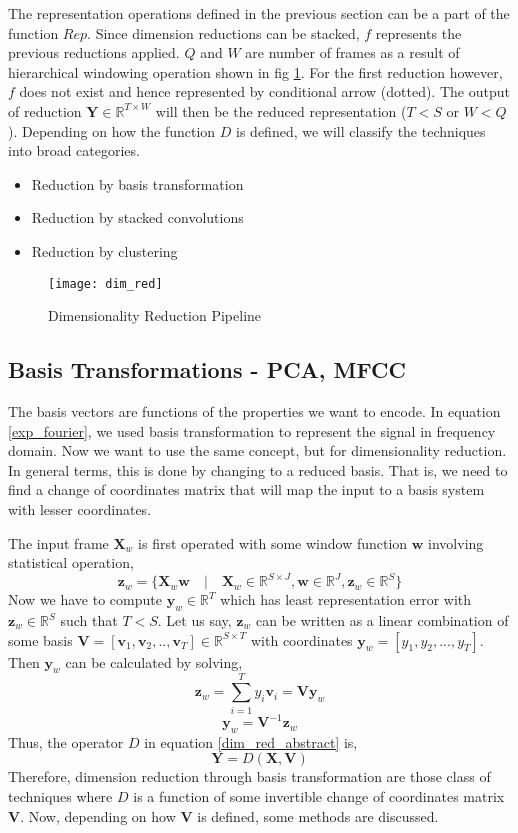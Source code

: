 \noindent The representation operations defined in the previous section can be a part of the function $Rep$. Since dimension reductions can be stacked, $f$ represents the previous reductions applied. $Q$ and $W$ are number of frames as a result of hierarchical windowing operation shown in fig \ref{fig:Dimensionality Reduction}. For the first reduction however, $f$ does not exist and hence represented by conditional arrow (dotted). The output of reduction $\textbf{Y} \in \mathbb{R}^{T \times W}$ will then be the reduced representation ($T < S$ or $W < Q$). Depending on how the function $D$ is defined, we will classify the techniques into broad categories.
\begin{itemize}
  \item Reduction by basis transformation
  \item Reduction by stacked convolutions
  \item Reduction by clustering 
\end{itemize} 
\begin{figure}[h] 
\centering
\texttt{[image: dim\_red]}
\caption{Dimensionality Reduction Pipeline}
 \label{fig:Dimensionality Reduction}
 \end{figure}
\FloatBarrier
\bigskip

\subsection{Basis Transformations - PCA, MFCC}
\label{basis}

The basis vectors are functions of the properties we want to encode. In equation \ref{exp_fourier}, we used basis transformation to represent the signal in frequency domain. Now we want to use the same concept, but for dimensionality reduction. In general terms, this is done by changing to a reduced basis. That is, we need to find a change of coordinates matrix that will map the input to a basis system with lesser coordinates. 
\bigskip

\noindent The input frame $\textbf{X}_{w}$ is first operated with some window function $\textbf{w}$ involving statistical operation,
\[
  \textbf{z}_{w} = \{\textbf{X}_{w}\textbf{w} \quad | \quad \textbf{X}_{w} \in \mathbb{R}^{S \times J}, \textbf{w} \in \mathbb{R}^{J}, \textbf{z}_{w} \in \mathbb{R}^{S}\}
\]    
Now we have to compute $\textbf{y}_{w} \in \mathbb{R}^{T}$ which has least representation error with $\textbf{z}_{w} \in \mathbb{R}^{S}$ such that $T < S$. Let us say, $\textbf{z}_{w}$ can be written as a linear combination of some basis $\textbf{V} = [\textbf{v}_{1}, \textbf{v}_{2}, ..,\textbf{v}_{T}] \in \mathbb{R}^{S \times T}$ with coordinates $\textbf{y}_{w} = [y_{1}, y_{2},...,y_{T}]$. Then $\textbf{y}_{w}$ can be calculated by solving,
\[
\textbf{z}_{w} = \displaystyle\sum_{i=1}^{T}y_{i}\textbf{v}_{i} = \textbf{V}\textbf{y}_{w}
\]
\[
\textbf{y}_{w} = \textbf{V}^{-1}\textbf{z}_{w}
\]
Thus, the operator $D$ in equation \ref{dim_red_abstract} is,
\[
\textbf{Y} = D(\textbf{X}, \textbf{V})
\]
Therefore, dimension reduction through basis transformation are those class of techniques where $D$ is a function of some invertible change of coordinates matrix $\textbf{V}$. Now, depending on how $\textbf{V}$ is defined, some methods are discussed.

